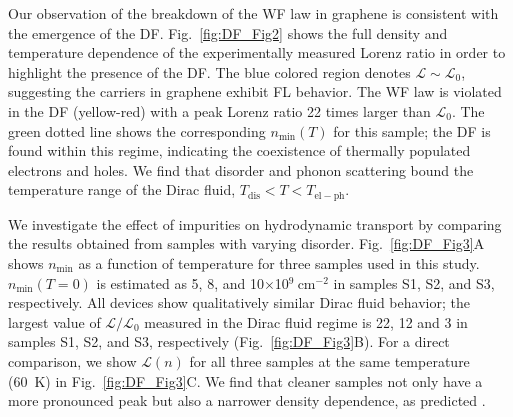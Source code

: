 Our observation of the breakdown of the WF law in graphene is consistent with the emergence of the DF. Fig.~\ref{fig:DF_Fig2} shows the full density and temperature dependence of the experimentally measured Lorenz ratio in order to highlight the presence of the DF. The blue colored region denotes $\mathcal{L}\sim\mathcal{L}_0$, suggesting the carriers in graphene exhibit FL behavior. The WF law is violated in the DF (yellow-red) with a peak Lorenz ratio 22 times larger than $\mathcal{L}_0$. The green dotted line shows the corresponding $n_{\mathrm{min}}(T)$ for this sample; the DF is found within this regime, indicating the coexistence of thermally populated electrons and holes. We find that disorder and phonon scattering bound the temperature range of the Dirac fluid, $T_{\mathrm{dis}}<T<T_{\mathrm{el-ph}}$.

We investigate the effect of impurities on hydrodynamic transport by comparing the results obtained from samples with varying disorder. Fig.~\ref{fig:DF_Fig3}A shows $n_{\mathrm{min}}$ as a function of temperature for three samples used in this study. $n_{\mathrm{min}}(T=0)$ is estimated as 5, 8, and 10$\times$10$^9~$cm$^{-2}$ in samples S1, S2, and S3, respectively. All devices show qualitatively similar Dirac fluid behavior; the largest value of $\mathcal{L}/\mathcal{L}_0$ measured in the Dirac fluid regime is 22, 12 and 3 in samples S1, S2, and S3, respectively (Fig.~\ref{fig:DF_Fig3}B). For a direct comparison, we show $\mathcal{L}(n)$ for all three samples at the same temperature (60~K) in Fig.~\ref{fig:DF_Fig3}C. We find that cleaner samples not only have a more pronounced peak but also a narrower density dependence, as predicted \cite{muller_quantum-critical_2008, foster_slow_2009}.

